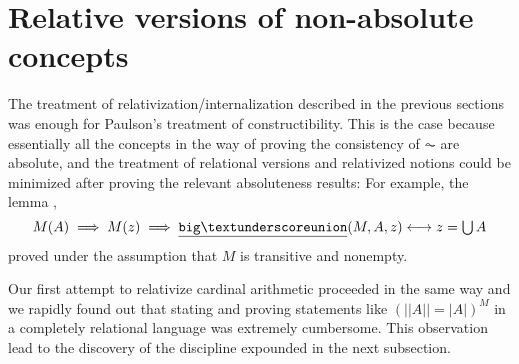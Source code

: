 \section{Relative versions of non-absolute concepts}
\label{sec:relat-vers-non-absol}

The treatment of relativization/internalization described in the
previous sections was enough for Paulson's treatment of
constructibility. This is the case because essentially all the
concepts in the way of proving the consistency of $\AC$ are
absolute, and the treatment of relational versions and relativized notions
could be minimized after proving the relevant absoluteness results:
For example, the lemma ,
\[
  M(A) \implies M(z) \implies \isatt{big{\uscore}union}(M, A, z) \longleftrightarrow z = \union
  A
\]
proved under the assumption that $M$ is transitive and nonempty.

Our first attempt to relativize cardinal arithmetic proceeded in the
same way
and we rapidly found out that stating and proving statements like $(||A||
= |A|) ^M$ in a completely relational language was extremely
cumbersome. This observation lead to the discovery of the discipline
expounded in the next subsection.


